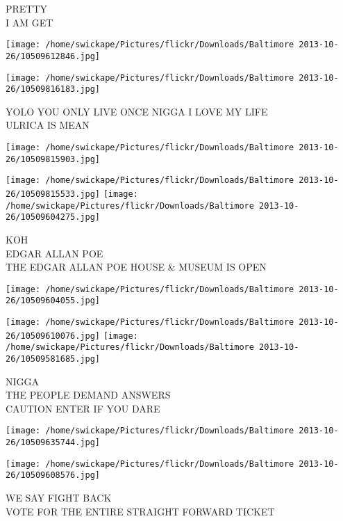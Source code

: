 \documentclass[10pt,letterpaper]{article}
\begin{document}
PRETTY\\
I AM GET\\
\pagebreak

\texttt{[image: /home/swickape/Pictures/flickr/Downloads/Baltimore 2013-10-26/10509612846.jpg]}

\vspace{0.25in}
\texttt{[image: /home/swickape/Pictures/flickr/Downloads/Baltimore 2013-10-26/10509816183.jpg]}

YOLO YOU ONLY LIVE ONCE NIGGA I LOVE MY LIFE\\
ULRICA IS MEAN\\
\pagebreak

\texttt{[image: /home/swickape/Pictures/flickr/Downloads/Baltimore 2013-10-26/10509815903.jpg]}

\vspace{0.25in}
\texttt{[image: /home/swickape/Pictures/flickr/Downloads/Baltimore 2013-10-26/10509815533.jpg]}
\texttt{[image: /home/swickape/Pictures/flickr/Downloads/Baltimore 2013-10-26/10509604275.jpg]}

KOH\\
EDGAR ALLAN POE\\
THE EDGAR ALLAN POE HOUSE \& MUSEUM IS OPEN\\
\pagebreak

\texttt{[image: /home/swickape/Pictures/flickr/Downloads/Baltimore 2013-10-26/10509604055.jpg]}

\vspace{0.25in}
\texttt{[image: /home/swickape/Pictures/flickr/Downloads/Baltimore 2013-10-26/10509610076.jpg]}
\texttt{[image: /home/swickape/Pictures/flickr/Downloads/Baltimore 2013-10-26/10509581685.jpg]}

NIGGA\\
THE PEOPLE DEMAND ANSWERS\\
CAUTION ENTER IF YOU DARE\\
\pagebreak

\texttt{[image: /home/swickape/Pictures/flickr/Downloads/Baltimore 2013-10-26/10509635744.jpg]}

\vspace{0.25in}
\texttt{[image: /home/swickape/Pictures/flickr/Downloads/Baltimore 2013-10-26/10509608576.jpg]}

WE SAY FIGHT BACK\\
VOTE FOR THE ENTIRE STRAIGHT FORWARD TICKET\\
\pagebreak
\end{document}
